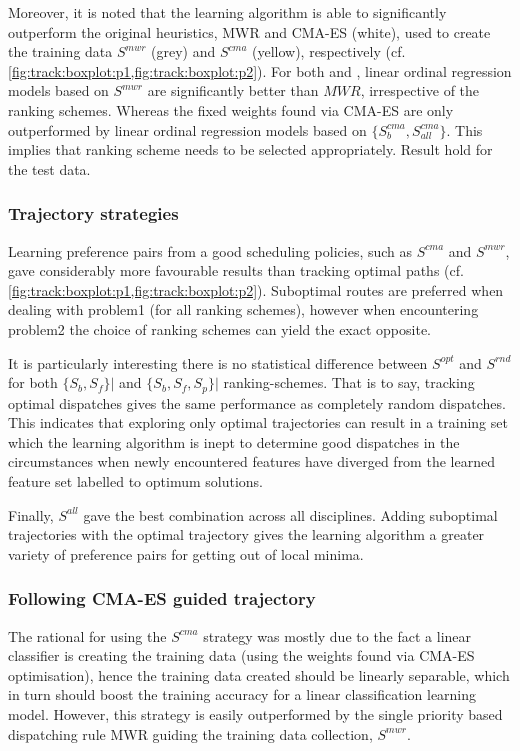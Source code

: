 Moreover, it is noted that the learning algorithm is able to significantly outperform the original heuristics, MWR and CMA-ES (white), used to create the training data $S^{mwr}$ (grey) and $S^{cma}$ (yellow), respectively (cf. \cref{fig:track:boxplot:p1,fig:track:boxplot:p2}). For both  and , linear ordinal regression models based on $S^{mwr}$ are significantly better than $MWR$, irrespective of the ranking schemes. Whereas the fixed weights found via CMA-ES are only outperformed by linear ordinal regression models based on $\{S_b^{cma},S_{all}^{cma}\}$. This implies that ranking scheme needs to be selected appropriately. Result hold for the test data.

\subsubsection{Trajectory strategies}
Learning preference pairs from a good scheduling policies, such as $S^{cma}$ and $S^{mwr}$, gave considerably more favourable results than tracking optimal paths (cf. \cref{fig:track:boxplot:p1,fig:track:boxplot:p2}). Suboptimal routes are preferred when dealing with problem{1} (for all ranking schemes), however when encountering problem{2} the choice of ranking schemes can yield the exact opposite.

It is particularly interesting there is no statistical difference between $S^{opt}$ and $S^{rnd}$ for both $\{S_{b},S_{f}\}\big|$ and $\{S_b,S_f,S_p\}\big|$ ranking-schemes. That is to say, tracking optimal dispatches gives the same performance as completely random dispatches. This indicates that exploring only optimal trajectories can result in a training set which the learning algorithm is inept to determine good dispatches in the circumstances when newly encountered features have diverged from the learned feature set labelled to optimum solutions. 

Finally, $S^{all}$ gave the best combination across all disciplines. Adding suboptimal trajectories with the optimal trajectory gives the learning algorithm a greater variety of preference pairs for getting out of local minima.

\subsubsection{Following CMA-ES guided trajectory}
The rational for using the $S^{cma}$ strategy was mostly due to the fact a linear classifier is creating the training data (using the weights found via CMA-ES optimisation), hence the training data created should be linearly separable, which in turn should boost the training accuracy for a linear classification learning model. However, this strategy is easily outperformed by the single priority based dispatching rule MWR guiding the training data collection, $S^{mwr}$. 


